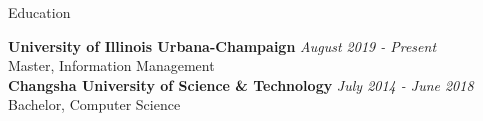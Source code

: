 \documentclass{resume} %
\begin{document}

\begin{rSection}{Education}

{\bf University of Illinois Urbana-Champaign} \hfill {\em August 2019 - Present} 
\\ Master, Information Management
\\{\bf Changsha University of Science \& Technology} \hfill {\em July 2014 - June 2018} 
\\ Bachelor, Computer Science


\end{rSection}
\end{document}
